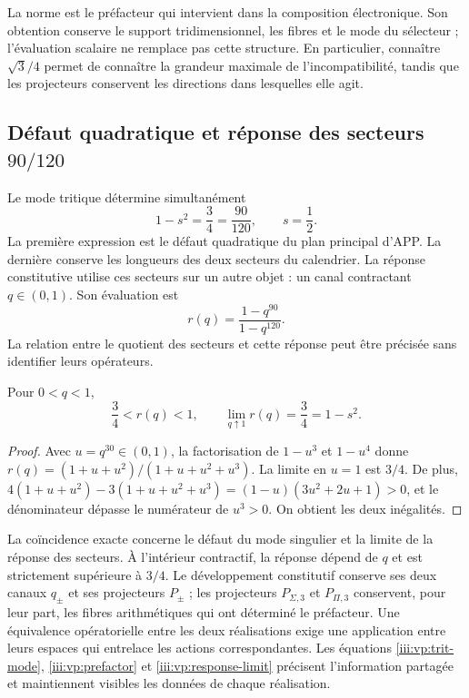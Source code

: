 La norme est le préfacteur qui intervient dans la composition électronique.
Son obtention conserve le support tridimensionnel, les fibres et le mode
du sélecteur ; l’évaluation scalaire ne remplace pas cette structure. En
particulier, connaître $\sqrt3/4$ permet de connaître la grandeur maximale de
l’incompatibilité, tandis que les projecteurs conservent les directions
dans lesquelles elle agit.

\clearpage
\subsection{Défaut quadratique et réponse des secteurs \(90/120\)}

Le mode tritique détermine simultanément
\begin{equation}
 1-s^2=\frac34=\frac{90}{120},\qquad s=\frac12.
 \label{iii:vp:defect-ratio}
\end{equation}
La première expression est le défaut quadratique du plan principal d'APP. La dernière conserve les longueurs des deux secteurs du calendrier. La réponse constitutive utilise ces secteurs sur un autre objet : un canal contractant $q\in(0,1)$. Son évaluation est
\[
 r(q)=\frac{1-q^{90}}{1-q^{120}}.
\]
La relation entre le quotient des secteurs et cette réponse peut être
précisée sans identifier leurs opérateurs.

\begin{proposition}
Pour $0<q<1$,
\begin{equation}
 \frac34<r(q)<1,\qquad
 \lim_{q\uparrow1}r(q)=\frac34=1-s^2.
 \label{iii:vp:response-limit}
\end{equation}
\end{proposition}
\begin{proof}
Avec $u=q^{30}\in(0,1)$, la factorisation de $1-u^3$ et
$1-u^4$ donne
$r(q)=(1+u+u^2)/(1+u+u^2+u^3)$. La limite en $u=1$ est
$3/4$. De plus,
$4(1+u+u^2)-3(1+u+u^2+u^3)
=(1-u)(3u^2+2u+1)>0$, et le dénominateur dépasse le numérateur
de $u^3>0$. On obtient les deux inégalités.
\end{proof}

La coïncidence exacte concerne le défaut du mode singulier et la limite
de la réponse des secteurs. À l’intérieur contractif, la réponse
dépend de $q$ et est strictement supérieure à $3/4$. Le développement
constitutif conserve ses deux canaux $q_\pm$ et ses projecteurs
$P_\pm$ ; les projecteurs $P_{\Sigma,3}$ et $P_{\Pi,3}$ conservent,
pour leur part, les fibres arithmétiques qui ont déterminé le préfacteur.
Une équivalence opératorielle entre les deux réalisations exige une application
entre leurs espaces qui entrelace les actions correspondantes.
Les équations \eqref{iii:vp:trit-mode}, \eqref{iii:vp:prefactor} et
\eqref{iii:vp:response-limit} précisent l’information partagée et
maintiennent visibles les données de chaque réalisation.
